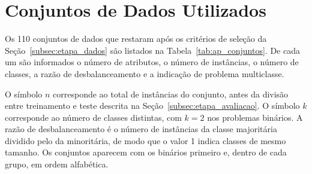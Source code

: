 \appendix
\chapter{Conjuntos de Dados Utilizados}
\label{ap:conjuntos}

Os 110 conjuntos de dados que restaram após os critérios de seleção da
Seção~\ref{subsec:etapa_dados} são listados na Tabela~\ref{tab:ap_conjuntos}. De cada um
são informados o número de atributos, o número de instâncias, o número de classes, a
razão de desbalanceamento e a indicação de problema multiclasse.

O símbolo $n$ corresponde ao total de instâncias do conjunto, antes da divisão entre
treinamento e teste descrita na Seção~\ref{subsec:etapa_avaliacao}. O símbolo $k$
corresponde ao número de classes distintas, com $k = 2$ nos problemas binários. A razão
de desbalanceamento é o número de instâncias da classe majoritária dividido pelo da
minoritária, de modo que o valor 1 indica classes de mesmo tamanho. Os conjuntos
aparecem com os binários primeiro e, dentro de cada grupo, em ordem alfabética.

